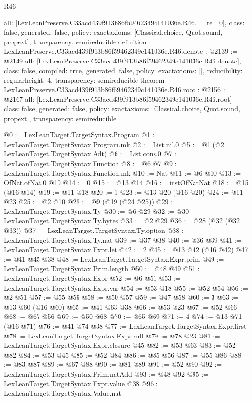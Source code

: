 \begin{lexlean}{R46}
\begin{coremodule}
{  all: [LexLeanPreserve.C33acd439f913b86f59462349c141036e.R46.__rel_0],
  class: false,
  generated: false,
  policy: exact{axioms: [Classical.choice, Quot.sound, propext]},
  transparency: semireducible
}
definition LexLeanPreserve.C33acd439f913b86f59462349c141036e.R46.denote : @2139 := @2149 {
  all: [LexLeanPreserve.C33acd439f913b86f59462349c141036e.R46.denote],
  class: false,
  compiled: true,
  generated: false,
  policy: exact{axioms: []},
  reducibility: regular{height: 4},
  transparency: semireducible
}
theorem LexLeanPreserve.C33acd439f913b86f59462349c141036e.R46.root : @2156 := @2167 {
  all: [LexLeanPreserve.C33acd439f913b86f59462349c141036e.R46.root],
  class: false,
  generated: false,
  policy: exact{axioms: [Classical.choice, Quot.sound, propext]},
  transparency: semireducible
}

@0 := LexLeanTarget.TargetSyntax.Program
@1 := LexLeanTarget.TargetSyntax.Program.mk
@2 := List.nil.{0}
@5 := @1 (@2 LexLeanTarget.TargetSyntax.Adt)
@6 := List.cons.{0}
@7 := LexLeanTarget.TargetSyntax.Function
@8 := @6 @7
@9 := LexLeanTarget.TargetSyntax.Function.mk
@10 := Nat
@11 := @6 @10
@13 := OfNat.ofNat.{0} @10
@14 := 0
@15 := @13 @14
@16 := instOfNatNat
@18 := @15 (@16 @14)
@19 := @11 @18
@20 := 1
@23 := @13 @20 (@16 @20)
@24 := @11 @23
@25 := @2 @10
@28 := @9 (@19 (@24 @25))
@29 := LexLeanTarget.TargetSyntax.Ty
@30 := @6 @29
@32 := @30 LexLeanTarget.TargetSyntax.Ty.bytes
@33 := @2 @29
@36 := @28 (@32 (@32 @33))
@37 := LexLeanTarget.TargetSyntax.Ty.option
@38 := LexLeanTarget.TargetSyntax.Ty.nat
@39 := @37 @38
@40 := @36 @39
@41 := LexLeanTarget.TargetSyntax.Expr.let
@42 := 2
@45 := @13 @42 (@16 @42)
@47 := @41 @45 @38
@48 := LexLeanTarget.TargetSyntax.Expr.prim
@49 := LexLeanTarget.TargetSyntax.Prim.length
@50 := @48 @49
@51 := LexLeanTarget.TargetSyntax.Expr
@52 := @6 @51
@53 := LexLeanTarget.TargetSyntax.Expr.var
@54 := @53 @18
@55 := @52 @54
@56 := @2 @51
@57 := @55 @56
@58 := @50 @57
@59 := @47 @58
@60 := 3
@63 := @13 @60 (@16 @60)
@65 := @41 @63 @38
@66 := @53 @23
@67 := @52 @66
@68 := @67 @56
@69 := @50 @68
@70 := @65 @69
@71 := 4
@74 := @13 @71 (@16 @71)
@76 := @41 @74 @38
@77 := LexLeanTarget.TargetSyntax.Expr.first
@78 := LexLeanTarget.TargetSyntax.Expr.call
@79 := @78 @23
@81 := LexLeanTarget.TargetSyntax.Expr.closure @45
@82 := @53 @63
@83 := @52 @82
@84 := @53 @45
@85 := @52 @84
@86 := @85 @56
@87 := @55 @86
@88 := @83 @87
@89 := @67 @88
@90 := @81 @89
@91 := @52 @90
@92 := LexLeanTarget.TargetSyntax.Prim.natAdd
@93 := @48 @92
@95 := LexLeanTarget.TargetSyntax.Expr.value @38
@96 := LexLeanTarget.TargetSyntax.Value.nat

\end{coremodule}
\end{lexlean}
